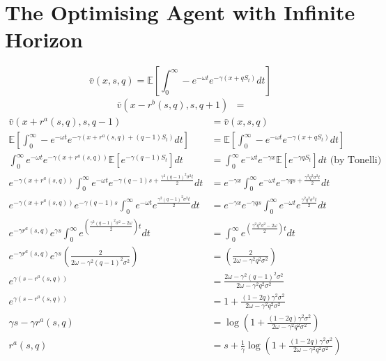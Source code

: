 \section{The Optimising Agent with Infinite Horizon}
\begin{equation*}
    \bar v(x,s,q)=\mathbb{E}\left[\int_{0}^{\infty}-e^{-\omega t}e^{-\gamma(x+qS_t)}dt\right]
\end{equation*}
\begin{align*}
    \bar{v}(x-r^b(s,q),s,q+1)&=
\end{align*}
\begin{align*}
    \bar{v}(x+r^a(s,q),s,q-1)&=\bar{v}(x,s,q)\\
    \mathbb{E}\left[\int_{0}^{\infty}-e^{-\omega t}e^{-\gamma(x+r^a(s,q)+(q-1)S_t)}dt\right]&=\mathbb{E}\left[\int_{0}^{\infty}-e^{-\omega t}e^{-\gamma(x+qS_t)}dt\right]\\
    \int_{0}^{\infty}e^{-\omega t}e^{-\gamma(x+r^a(s,q))}\mathbb{E}\left[e^{-\gamma(q-1)S_t}\right]dt&=\int_{0}^{\infty}e^{-\omega t}e^{-\gamma x}\mathbb{E}\left[e^{-\gamma qS_t}\right]dt\textrm{ (by Tonelli)}\\
    e^{-\gamma(x+r^a(s,q))}\int_{0}^{\infty}e^{-\omega t}e^{-\gamma(q-1)s+\frac{\gamma^2(q-1)^2\sigma^2t}{2}}dt&=e^{-\gamma x}\int_{0}^{\infty}e^{-\omega t}e^{-\gamma qs+\frac{\gamma^2q^2\sigma^2t}{2}}dt\\
    e^{-\gamma(x+r^a(s,q))}e^{-\gamma(q-1)s}\int_{0}^{\infty}e^{-\omega t}e^{\frac{\gamma^2(q-1)^2\sigma^2t}{2}}dt&=e^{-\gamma x}e^{-\gamma qs}\int_{0}^{\infty}e^{-\omega t}e^{\frac{\gamma^2q^2\sigma^2t}{2}}dt\\
    e^{-\gamma r^a(s,q)}e^{\gamma s}\int_{0}^{\infty}e^{\left(\frac{\gamma^2(q-1)^2\sigma^2-2\omega}{2}\right)t}dt&=\int_{0}^{\infty}e^{\left(\frac{\gamma^2q^2\sigma^2-2\omega}{2}\right)t}dt\\
    e^{-\gamma r^a(s,q)}e^{\gamma s}\left(\frac{2}{2\omega-\gamma^2(q-1)^2\sigma^2}\right)&=\left(\frac{2}{2\omega-\gamma^2q^2\sigma^2}\right)\\
    e^{\gamma(s-r^a(s,q))}&=\frac{2\omega-\gamma^2(q-1)^2\sigma^2}{2\omega-\gamma^2q^2\sigma^2}\\
    e^{\gamma(s-r^a(s,q))}&=1+\frac{(1-2q)\gamma^2\sigma^2}{2\omega-\gamma^2q^2\sigma^2}\\
    \gamma s - \gamma r^a(s,q)&=\log\left(1+\frac{(1-2q)\gamma^2\sigma^2}{2\omega-\gamma^2q^2\sigma^2}\right)\\
    r^a(s,q) &= s+\frac{1}{\gamma}\log\left(1+\frac{(1-2q)\gamma^2\sigma^2}{2\omega-\gamma^2q^2\sigma^2}\right)
\end{align*}

